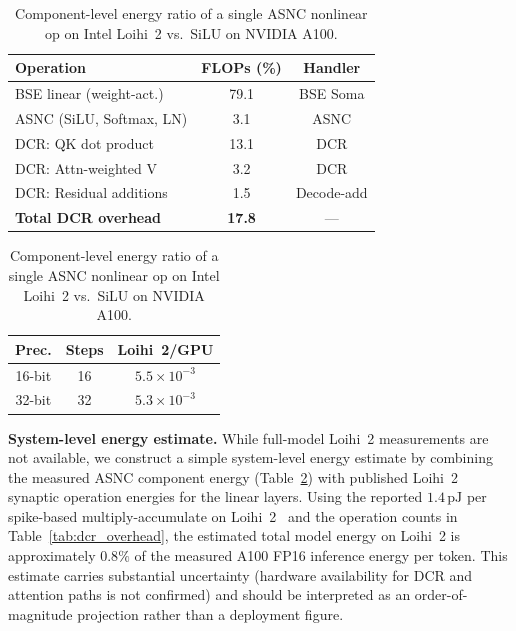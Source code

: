 \documentclass{article}
\theoremstyle{plain}
\theoremstyle{definition}
\theoremstyle{remark}
\begin{document}
\begin{table}[h!]
\begin{minipage}[t]{0.62\textwidth}
\centering
\footnotesize
\setlength{\tabcolsep}{3pt}
\caption{Per-forward-pass operation breakdown on LLaMA-2 7B, expressed
as relative integer FLOPs.}
\label{tab:dcr_overhead}
\begin{tabular}{lcc}
\toprule
\textbf{Operation} & \textbf{FLOPs (\%)} & \textbf{Handler} \\
\midrule
BSE linear (weight-act.)           & 79.1 & BSE Soma \\
ASNC (SiLU, Softmax, LN)           &  3.1 & ASNC \\
DCR: QK dot product                & 13.1 & DCR \\
DCR: Attn-weighted V               &  3.2 & DCR \\
DCR: Residual additions            &  1.5 & Decode-add \\
\midrule
\textbf{Total DCR overhead}        & \textbf{17.8} & --- \\
\bottomrule
\end{tabular}
\end{minipage}\hfill
\begin{minipage}[t]{0.36\textwidth}
\centering
\footnotesize
\setlength{\tabcolsep}{3pt}
\caption{Component-level energy ratio of a single ASNC nonlinear op on
Intel Loihi~2 vs.\ SiLU on NVIDIA A100.}
\label{tab:energy}
\vspace{0.5em}
\begin{tabular}{ccc}
\toprule
\textbf{Prec.} & \textbf{Steps} & \textbf{Loihi~2/GPU} \\
\midrule
16-bit & 16 & $5.5 \times 10^{-3}$ \\
32-bit & 32 & $5.3 \times 10^{-3}$ \\
\bottomrule
\end{tabular}
\end{minipage}
\end{table}

\noindent\textbf{System-level energy estimate.}
While full-model Loihi~2 measurements are not available, we construct a
simple system-level energy estimate by combining the measured ASNC component
energy (Table~\ref{tab:energy}) with published Loihi~2 synaptic operation
energies for the linear layers. Using the reported $1.4\,\mathrm{pJ}$ per
spike-based multiply-accumulate on Loihi~2~\citep{davies2021loihi} and the
operation counts in Table~\ref{tab:dcr_overhead}, the estimated total model
energy on Loihi~2 is approximately $0.8\%$ of the measured A100 FP16 inference
energy per token. This estimate carries substantial uncertainty (hardware
availability for DCR and attention paths is not confirmed) and should be
interpreted as an order-of-magnitude projection rather than a deployment
figure.
\end{document}
